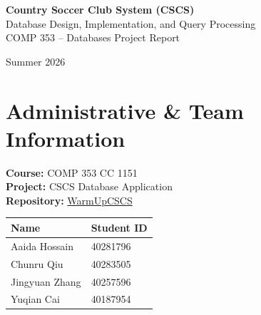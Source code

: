 \documentclass[11pt,a4paper]{article}
\begin{document}


\begin{center}


{\LARGE\bfseries\color{primary}
Country Soccer Club System (CSCS)
}
\\[0.4cm]


{\large\color{secondary}
Database Design, Implementation, and Query Processing
}
\\[0.5cm]


{\large
COMP 353 -- Databases Project Report
}


\vspace{0.5cm}


{\large
Summer 2026
}


\end{center}




\section*{Administrative \& Team Information}


\begin{minipage}{0.45\textwidth}

\textbf{Course:} COMP 353 CC 1151\\
\textbf{Project:} CSCS Database Application\\
\textbf{Repository:}
\href{https://github.com/DatabasesSummerII2026/WarmUp_CSCS}
{WarmUpCSCS}

\end{minipage}
\hfill
\begin{minipage}{0.5\textwidth}

\begin{tabular}{ll}
\toprule
Name & Student ID\\
\midrule
Aaida Hossain & 40281796\\
Chunru Qiu & 40283505\\
Jingyuan Zhang & 40257596 \\
Yuqian Cai & 40187954\\

\bottomrule
\end{tabular}

\end{minipage}
\end{document}

